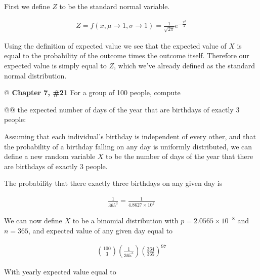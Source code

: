 \documentclass[11pt]{article}\usepackage[]{graphicx}\usepackage[]{xcolor}
\begin{document}
\begin{easylist}[enumerate]
    First we define $Z$ to be the standard normal variable.

    \begin{equation*}
        \begin{aligned}
            Z = f(x, \mu \to 1, \sigma \to 1) = \frac{1}{\sqrt{2\pi}} e^{ -\frac{x^2}{2} }
        \end{aligned}
    \end{equation*}

    Using the definition of expected value we see that the expected value of $X$ is equal to the probability of the
    outcome times the outcome itself. Therefore our expected value is simply equal to $Z$, which we've already defined
    as the standard normal distribution.

    @ \textbf{Chapter 7, \#21} For a group of 100 people, compute

    @@ the expected number of days of the year that are birthdays of exactly 3 people:\newline

    Assuming that each individual's birthday is independent of every other, and that the probability of a birthday
    falling on any day is uniformly distributed, we can define a new random variable $X$ to be the number of days of the
    year that there are birthdays of exactly 3 people.\newline

    The probability that there exactly three birthdays on any given day is

    \begin{equation*}
        \begin{aligned}
            \frac{1}{365^3} = \frac{1}{\ensuremath{4.8627\times 10^{7}}}
        \end{aligned}
    \end{equation*}

    We can now define $X$ to be a binomial distribution with $p=\ensuremath{2.0565\times 10^{-8}}$ and $n=365$, and expected value of any
    given day equal to

    \begin{equation*}
        \begin{aligned}
            {100 \choose 3} \left( \frac{1}{365^3} \right) {\left( \frac{364}{365} \right)}^{97}
        \end{aligned}
    \end{equation*}

    With yearly expected value equal to


\end{easylist}
\end{document}
